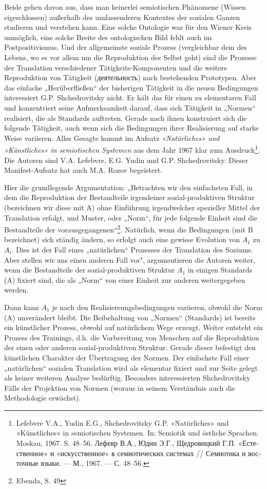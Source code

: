 \documentclass[11pt,a4paper]{article}
\begin{document}
Beide gehen davon aus, dass man keinerlei semiotischen Phänomene (Wissen
eigeschlossen) außerhalb des umfassenderen Kontextes der sozialen Ganzen
studieren und verstehen kann. Eine solche Ontologie war für den Wiener Kreis
unmöglich, eine solche Breite des ontologischen Bild fehlt auch im
Postpositivismus. Und der allgemeinste soziale Prozess (vergleichbar dem des
Lebens, wo es vor allem um die Reproduktion des Selbst geht) sind die Prozesse
der Translation verschiedener Tätigkeits-Komponenten und die weitere
Reproduktion von Tätigkeit (\foreignlanguage{russian}{деятельность}) nach
bestehenden Prototypen. Aber das einfache „Herüberfließen“ der bisherigen
Tätigkeit in die neuen Bedingungen interessiert G.P. Shchedrovitsky nicht. Er
hält das für einen zu elementaren Fall und konzentriert seine Aufmerksamkeit
darauf, dass sich Tätigkeit in „Normen“ realisiert, die als Standards
auftreten.  Gerade nach ihnen konstruiert sich die folgende Tätigkeit, auch
wenn sich die Bedingungen ihrer Realisierung auf starke Weise variieren. Alles
Gesagte kommt im Aufsatz \emph{«Natürliches» und «Künstliches» in semiotischen
  Systemen} aus dem Jahr 1967 klar zum Ausdruck\footnote{Lefebvre V.A., Yudin
  E.G., Shchedrovitsky G.P. «Natürliches» und «Künstliches» in semiotischen
  Systemen. In: Semiotik und östliche Sprachen. Moskau,
  1967. S. 48–56. \foreignlanguage{russian}{Лефевр В.А., Юдин Э.Г.,
    Щедровицкий Г.П. «Естественное» и «искусственное» в семиотических системах
    // Семиотика и восточные языки.  — М., 1967. — С. 48–56.}}.  Die Autoren
sind V.A. Lefebvre, E.G. Yudin und G.P. Shchedrovitsky. Dieser
Manifest-Aufsatz hat auch M.A. Rozov begeistert.

Hier die grundlegende Argumentation: „Betrachten wir den einfachsten Fall, in
dem die Reproduktion der Bestandteile irgendeiner sozial-produktiven Struktur
(bezeichnen wir diese mit A) ohne Einführung irgendwelcher spezieller Mittel
der Translation erfolgt, und Muster, oder „Norm“, für jede folgende Einheit
sind die Bestandteile der vorausgegangenen“\footnote{Ebenda, S. 49}.
Natürlich, wenn die Bedingungen (mit B bezeichnet) sich ständig ändern, so
erfolgt auch eine gewisse Evolution von $A_1$ zu $A_i$. Dies ist der Fall
eines „natürlichen“ Prozesses der Translation des Soziums.  Aber stellen wir
uns einen anderen Fall vor", argumentieren die Autoren weiter, wenn die
Bestandteile der sozial-produktiven Struktur $A_1$ in einigen
Standards (A) fixiert sind, die als „Norm“ von einer Einheit zur anderen
weitergegeben werden.

Dann kann $A_1$ je nach den Realisiereungsbedingungen variieren, obwohl die
Norm (A) unverändert bleibt. Die Beibehaltung von „Normen“ (Standards) ist
bereits ein künstlicher Prozess, obwohl auf natürlichem Wege erzeugt.  Weiter
entsteht ein Prozess des Trainings, d.h. die Vorbereitung von Menschen auf die
Reproduktion der einen oder anderen sozial-produktiven Struktur. Gerade dieser
befestigt den künstlichen Charakter der Übertragung der Normen. Der einfachste
Fall einer „natürlichen“ sozialen Translation wird als elementar fixiert und
zur Seite gelegt als keiner weiteren Analyse bedürftig. Besonders
interessierten Shchedrovitsky Fälle der Projektion von Normen (woraus in
seinem Verständnis auch die Methodologie erwächst).
\end{document}
